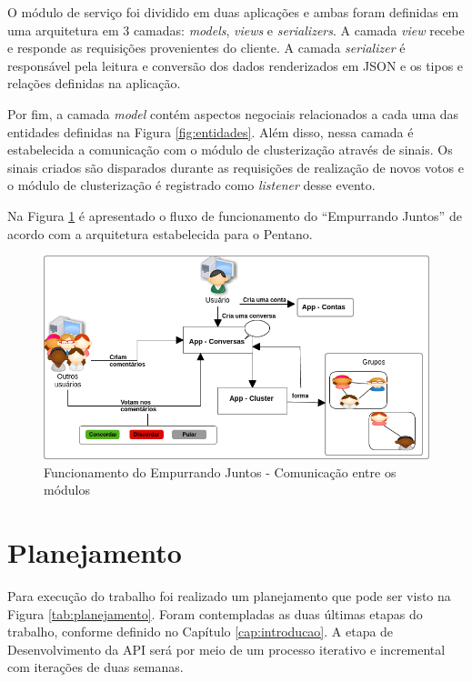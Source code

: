 O módulo de serviço foi dividido em duas aplicações e ambas foram definidas em uma arquitetura
em 3 camadas: \textit{models}, \textit{views} e \textit{serializers}. 
A camada \textit{view} recebe e responde as requisições provenientes do cliente.
A camada \textit{serializer} é responsável pela leitura e conversão dos dados renderizados em JSON e os tipos e relações
definidas na aplicação.  

Por fim, a camada \textit{model} contém aspectos negociais relacionados a cada uma das entidades definidas na 
Figura \ref{fig:entidades}. Além disso, nessa camada é estabelecida a comunicação com o módulo de clusterização através de sinais.
Os sinais criados são disparados durante as requisições de realização de novos votos e o módulo de clusterização é registrado
como \textit{listener} desse evento.

Na Figura \ref{fig:resumo_ej_api} é apresentado o fluxo de funcionamento do ``Empurrando Juntos'' de acordo com a arquitetura
estabelecida para o Pentano.

\begin{figure}[bt!]
\centering
\includegraphics[scale=0.6]{figuras/resumo_ej_api.png}
\caption{Funcionamento do Empurrando Juntos - Comunicação entre os módulos}
\label{fig:resumo_ej_api}
\end{figure}

\vfill
\pagebreak

\section{Planejamento}

Para execução do trabalho foi realizado um planejamento que pode ser visto na Figura \ref{tab:planejamento}.
Foram contempladas as duas últimas etapas do trabalho, conforme definido no Capítulo \ref{cap:introducao}.
A etapa de Desenvolvimento da API será por meio de um processo iterativo e incremental com iterações de duas semanas. 

